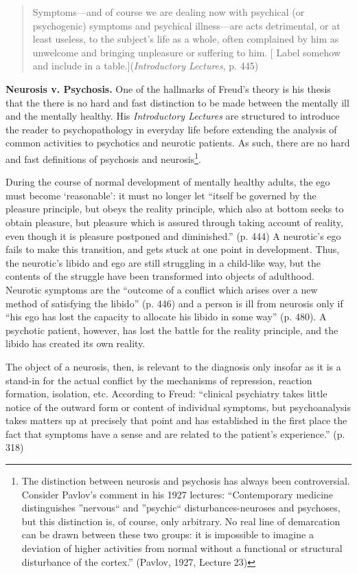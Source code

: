 \begin{quote}

Symptoms---and of course we are dealing now with psychical (or psychogenic) symptoms and psychical illness---are acts detrimental, or at least useless, to the subject's life as a whole, often complained by him as unwelcome and bringing unpleasure or suffering to him. [ Label somehow and include in a table.](\emph{Introductory Lectures}, p. 445)
\end{quote}

\textbf{Neurosis v. Psychosis.} One of the hallmarks of Freud's theory is his thesis that the there is no hard and fast distinction to be made between the mentally ill and the mentally healthy. His \emph{Introductory Lectures} are structured to introduce the reader to psychopathology in everyday life before extending the analysis of common activities to psychotics and neurotic patients. As such, there are no hard and fast definitions of psychosis and neurosis\footnote{The distinction between neurosis and psychosis has always been controversial. Consider Pavlov's comment in his 1927 lectures: ``Contemporary medicine distinguishes ''nervous`` and ''psychic`` disturbances-neuroses and psychoses, but this distinction is, of course, only arbitrary. No real line of demarcation can be drawn between these two groups: it is impossible to imagine a deviation of higher activities from normal without a functional or structural disturbance of the cortex.'' (Pavlov, 1927, Lecture 23)}.

During the course of normal development of mentally healthy adults, the ego must become `reasonable': it must no longer let ``itself be governed by the pleasure principle, but obeys the reality principle, which also at bottom seeks to obtain pleasure, but pleasure which is assured through taking account of reality, even though it is pleasure postponed and diminished.'' (p. 444) A neurotic's ego fails to make this transition, and gets stuck at one point in development. Thus, the neurotic's libido and ego are still struggling in a child-like way, but the contents of the struggle have been transformed into objects of adulthood. Neurotic symptoms are the ``outcome of a conflict which arises over a new method of satisfying the libido'' (p. 446) and a person is ill from neurosis only if ``his ego has lost the capacity to allocate his libido in some way'' (p. 480). A psychotic patient, however, has lost the battle for the reality principle, and the libido has created its own reality.

The object of a neurosis, then, is relevant to the diagnosis only insofar as it is a stand-in for the actual conflict by the mechanisms of repression, reaction formation, isolation, etc. According to Freud: ``clinical psychiatry takes little notice of the outward form or content of individual symptoms, but psychoanalysis takes matters up at precisely that point and has established in the first place the fact that symptoms have a sense and are related to the patient's experience.'' (p. 318)


